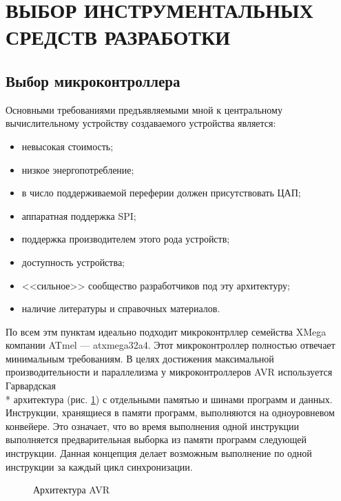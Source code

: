 \section{ВЫБОР ИНСТРУМЕНТАЛЬНЫХ СРЕДСТВ РАЗРАБОТКИ}

\subsection{Выбор микроконтроллера}
Основными требованиями предъявляемыми мной к центральному вычислительному устройству
создаваемого устройства является:
\begin{itemize}
	\item{} невысокая стоимость;
	\item{} низкое энергопотребление;
	\item{} в число поддерживаемой переферии должен присутствовать ЦАП;
	\item{} аппаратная поддержка SPI;
	\item{} поддержка производителем этого рода устройств;
	\item{} доступность устройства;
	\item{} <<сильное>> сообщество разработчиков под эту архитектуру;
	\item{} наличие литературы и справочных материалов.
\end{itemize}


По всем этм пунктам идеально подходит микроконтрллер семейства XMega компании ATmel --- atxmega32a4.
Этот микроконтроллер полностью отвечает минимальным требованиям. В целях достижения максимальной
производительности и параллелизма у микроконтроллеров AVR используется
Гарвардская\\*
архитектура (рис. \ref{img:avr_arch}) с отдельными памятью и шинами программ и данных. Инструкции,
хранящиеся в памяти программ, выполняются на одноуровневом конвейере. Это означает, что
во время выполнения одной инструкции выполняется предварительная выборка из памяти программ
следующей инструкции. Данная концепция делает возможным выполнение по одной инструкции за
каждый цикл синхронизации.

\begin{figure}[h]
	\caption{Архитектура AVR}
	\label{img:avr_arch}
\end{figure}


